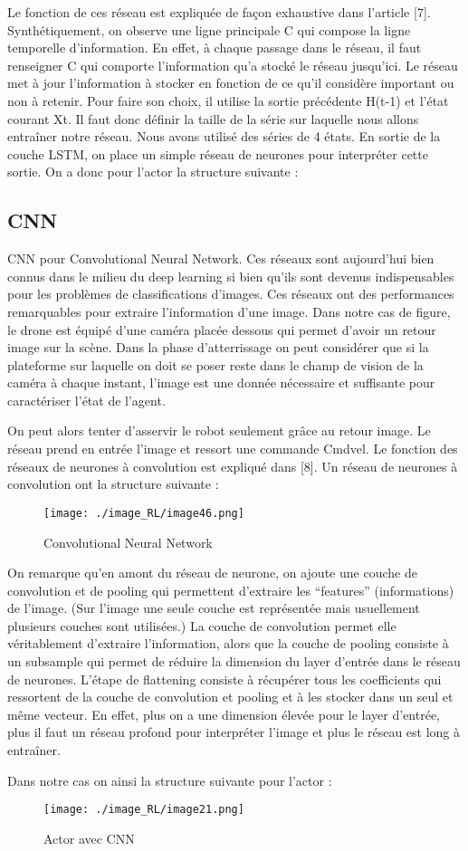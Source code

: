 Le fonction de ces réseau est expliquée de façon exhaustive dans l’article [7].
Synthétiquement, on observe une ligne principale C qui compose la ligne temporelle d’information. En effet, à chaque passage dans le réseau, il faut renseigner C qui comporte l’information qu'a stocké le réseau jusqu’ici. Le réseau met à jour l’information à stocker en fonction de ce qu'il considère important ou non à retenir. Pour faire son choix, il utilise la sortie précédente H(t-1) et l’état courant Xt.
Il faut donc définir la taille de la série sur laquelle nous allons entraîner notre réseau. Nous avons utilisé des séries de 4 états.
En sortie de la couche LSTM, on place un simple réseau de neurones pour interpréter cette sortie.
On a donc pour l’actor la structure suivante :

\subsection{CNN}

CNN pour Convolutional Neural Network. Ces réseaux sont aujourd’hui bien connus dans le milieu du deep learning si bien qu'ils sont devenus indispensables pour les problèmes de classifications d’images.
Ces réseaux ont des performances remarquables pour extraire l’information d’une image.
Dans notre cas de figure, le drone est équipé d’une caméra placée dessous qui permet d’avoir un retour image sur la scène.
Dans la phase d'atterrissage on peut considérer que si la plateforme sur laquelle on doit se poser reste dans le champ de vision de la caméra à chaque instant, l’image est une donnée nécessaire et suffisante pour caractériser l’état de l’agent.

On peut alors tenter d’asservir le robot seulement grâce au retour image.
Le réseau prend en entrée l’image et ressort une commande Cmdvel.
Le fonction des réseaux de neurones à convolution est expliqué dans [8].
Un réseau de neurones à convolution ont la structure suivante\cite{CONV} :
\begin{figure}[H]
    \centering
    \texttt{[image: ./image\_RL/image46.png]}
    \caption{Convolutional Neural Network  }
\end{figure}

On remarque qu’en amont du réseau de neurone, on ajoute une couche de convolution et de pooling qui permettent d’extraire les “features” (informations) de l’image. 
(Sur l’image une seule couche est représentée mais usuellement plusieurs couches sont utilisées.)
La couche de convolution permet elle véritablement d’extraire l’information, alors que la couche de pooling consiste à un subsample qui permet de réduire la dimension du layer d’entrée dans le réseau de neurones.
L’étape de flattening consiste à récupérer tous les coefficients qui ressortent de la couche de convolution et pooling et à les stocker dans un seul et même vecteur.
En effet, plus on a une dimension élevée pour le layer d'entrée, plus il faut un réseau profond pour interpréter l’image et plus le réseau est long à entraîner.

Dans notre cas on ainsi la structure suivante pour l’actor :

\begin{figure}[H]
    \centering
    \texttt{[image: ./image\_RL/image21.png]}
    \caption{ Actor avec CNN }
\end{figure}